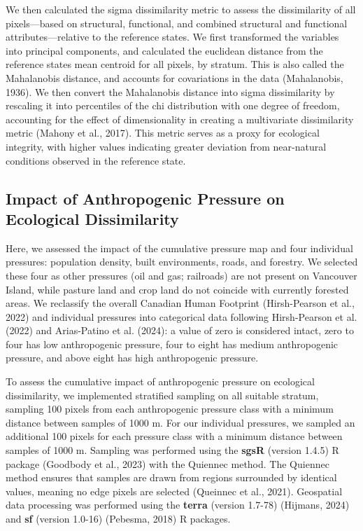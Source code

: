 \documentclass[
]{agujournal2019}
\begin{document}
We then calculated the sigma dissimilarity metric to assess the
dissimilarity of all pixels---based on structural, functional, and
combined structural and functional attributes---relative to the
reference states. We first transformed the variables into principal
components, and calculated the euclidean distance from the reference
states mean centroid for all pixels, by stratum. This is also called the
Mahalanobis distance, and accounts for covariations in the data
(Mahalanobis, 1936). We then convert the Mahalanobis distance into sigma
dissimilarity by rescaling it into percentiles of the chi distribution
with one degree of freedom, accounting for the effect of dimensionality
in creating a multivariate dissimilarity metric (Mahony et al., 2017).
This metric serves as a proxy for ecological integrity, with higher
values indicating greater deviation from near-natural conditions
observed in the reference state.

\subsection{Impact of Anthropogenic Pressure on Ecological
Dissimilarity}\label{impact-of-anthropogenic-pressure-on-ecological-dissimilarity}

Here, we assessed the impact of the cumulative pressure map and four
individual pressures: population density, built environments, roads, and
forestry. We selected these four as other pressures (oil and gas;
railroads) are not present on Vancouver Island, while pasture land and
crop land do not coincide with currently forested areas. We reclassify
the overall Canadian Human Footprint (Hirsh-Pearson et al., 2022) and
individual pressures into categorical data following Hirsh-Pearson et
al. (2022) and Arias-Patino et al. (2024): a value of zero is considered
intact, zero to four has low anthropogenic pressure, four to eight has
medium anthropogenic pressure, and above eight has high anthropogenic
pressure.

To assess the cumulative impact of anthropogenic pressure on ecological
dissimilarity, we implemented stratified sampling on all suitable
stratum, sampling 100 pixels from each anthropogenic pressure class with
a minimum distance between samples of 1000 m. For our individual
pressures, we sampled an additional 100 pixels for each pressure class
with a minimum distance between samples of 1000 m. Sampling was
performed using the \textbf{sgsR} (version 1.4.5) R package (Goodbody et
al., 2023) with the Quiennec method. The Quiennec method ensures that
samples are drawn from regions surrounded by identical values, meaning
no edge pixels are selected (Queinnec et al., 2021). Geospatial data
processing was performed using the \textbf{terra} (version 1.7-78)
(Hijmans, 2024) and \textbf{sf} (version 1.0-16) (Pebesma, 2018) R
packages.
\end{document}
